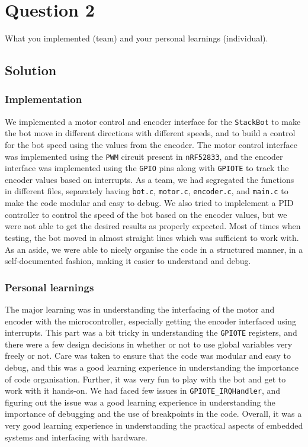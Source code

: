 \section*{Question 2}

What you implemented (team) and your personal learnings (individual).

\subsection*{Solution}

\subsubsection*{Implementation}

We implemented a motor control and encoder interface for the \texttt{StackBot} to make the bot move in different directions with different speeds, and to build a control for the bot speed using the values from the encoder.
The motor control interface was implemented using the \texttt{PWM} circuit present in \texttt{nRF52833}, and the encoder interface was implemented using the \texttt{GPIO} pins along with \texttt{GPIOTE} to track the encoder values based on interrupts.
As a team, we had segregated the functions in different files, separately having \texttt{bot.c}, \texttt{motor.c}, \texttt{encoder.c}, and \texttt{main.c} to make the code modular and easy to debug.
We also tried to implelement a PID controller to control the speed of the bot based on the encoder values, but we were not able to get the desired results as properly expected.
Most of times when testing, the bot moved in almost straight lines which was sufficient to work with.
As an aside, we were able to nicely organise the code in a structured manner, in a self-documented fashion, making it easier to understand and debug.

\subsubsection*{Personal learnings}

The major learning was in understanding the interfacing of the motor and encoder with the microcontroller, especially getting the encoder interfaced using interrupts.
This part was a bit tricky in understanding the \texttt{GPIOTE} registers, and there were a few design decisions in whether or not to use global variables very freely or not.
Care was taken to ensure that the code was modular and easy to debug, and this was a good learning experience in understanding the importance of code organisation.
Further, it was very fun to play with the bot and get to work with it hands-on.
We had faced few issues in \texttt{GPIOTE\_IRQHandler}, and figuring out the issue was a good learning experience in understanding the importance of debugging and the use of breakpoints in the code.
Overall, it was a very good learning experience in understanding the practical aspects of embedded systems and interfacing with hardware.
